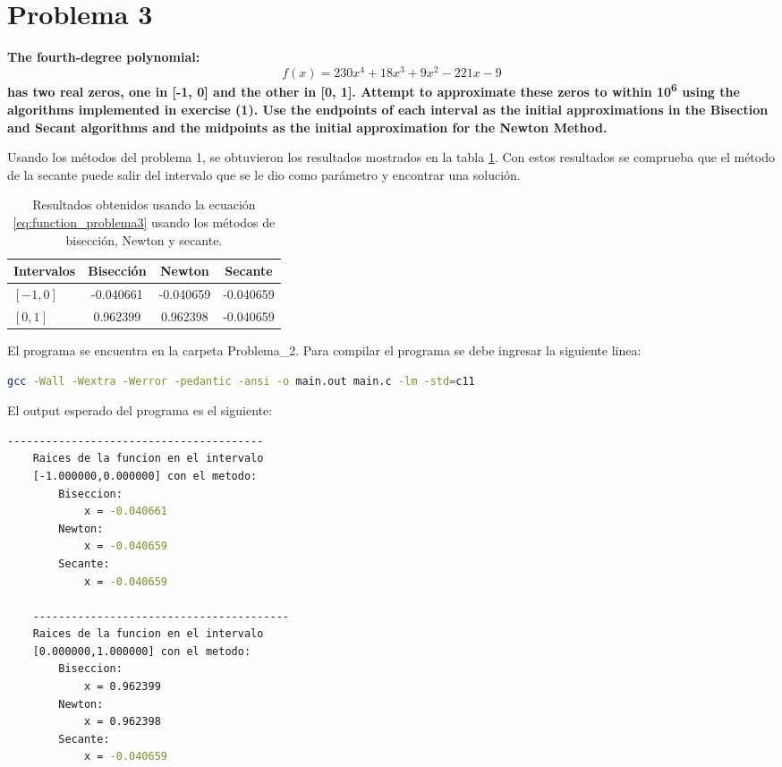 \section*{Problema 3}
\textbf{The fourth-degree polynomial:}
\begin{equation}
    f(x)= 230x^4+18x^3+9x^2-221x-9
    \label{eq:function_problema3}
\end{equation}
\textbf{has two real zeros, one in [-1, 0] and the other in [0, 1]. Attempt to approximate these zeros to within 10\textsuperscript{6} using the algorithms implemented in exercise (1). Use the endpoints of each interval as the initial approximations in the Bisection and Secant algorithms and the midpoints as the initial approximation for the Newton Method.}

Usando los métodos del problema 1, se obtuvieron los resultados mostrados en la tabla \ref{table:results_problema3}. Con estos resultados se comprueba que el método de la secante puede salir del intervalo que se le dio como parámetro y encontrar una solución.
\begin{table}[H]
    \centering
    \begin{tabular}{lccc}
        \hline
        \textbf{Intervalos} & \textbf{Bisección} & \textbf{Newton} & \textbf{Secante} \\ \hline
        $[-1,0]$            & -0.040661          & -0.040659       & -0.040659        \\
        $[0,1]$             & 0.962399           & 0.962398        & -0.040659        \\ \hline
    \end{tabular}
    \caption{Resultados obtenidos usando la ecuación \ref{eq:function_problema3} usando los métodos de bisección, Newton y secante.}
    \label{table:results_problema3}
\end{table}

El programa se encuentra en la carpeta \textcolor{citecolor}{Problema\_2}. Para compilar el programa se debe ingresar la siguiente linea:

\begin{lstlisting}[language=bash]
    gcc -Wall -Wextra -Werror -pedantic -ansi -o main.out main.c -lm -std=c11
\end{lstlisting}

El output esperado del programa es el siguiente:
\begin{lstlisting}[language=bash]
    ----------------------------------------
    Raices de la funcion en el intervalo
    [-1.000000,0.000000] con el metodo:
        Biseccion:
            x = -0.040661
        Newton:
            x = -0.040659
        Secante:
            x = -0.040659

    ----------------------------------------
    Raices de la funcion en el intervalo
    [0.000000,1.000000] con el metodo:
        Biseccion:
            x = 0.962399
        Newton:
            x = 0.962398
        Secante:
            x = -0.040659
\end{lstlisting}